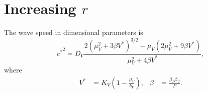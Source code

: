 \documentclass{jpmarticle}
\begin{document}



\section{Increasing $r$}

The wave speed in dimensional parameters is
\begin{equation}
  {c^*}^2 = D_V
    \frac{2 \left(\mu_V^2 + 3 \beta V^*\right)^{3/2}
      - \mu_V \left(2 \mu_V^2 + 9 \beta V^*\right)}
    {\mu_V^2 + 4 \beta V^*},
\end{equation}
where
\begin{align}
  V^* &= K_V \left(1 - \frac{\mu_V}{b_V}\right),
  &
  \beta &= \frac{\beta_P \beta_V}{P}.
\end{align}
\end{document}
